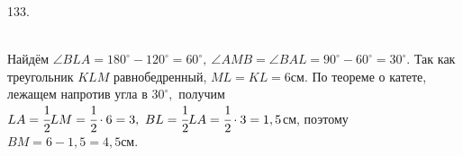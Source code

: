 133. \begin{figure}[ht!]
\end{figure}\\
Найдём $\angle BLA=180^\circ-120^\circ=60^\circ,\ \angle AMB=\angle BAL=90^\circ-60^\circ=30^\circ.$ Так как треугольник $KLM$ равнобедренный, $ML=KL=6$см. По теореме о катете, лежащем напротив угла в $30^\circ,$ получим $LA=\cfrac{1}{2}LM=\cfrac{1}{2}\cdot6=3,\ BL=\cfrac{1}{2}LA=\cfrac{1}{2}\cdot3=1,5$см, поэтому $BM=6-1,5=4,5$см.\\
